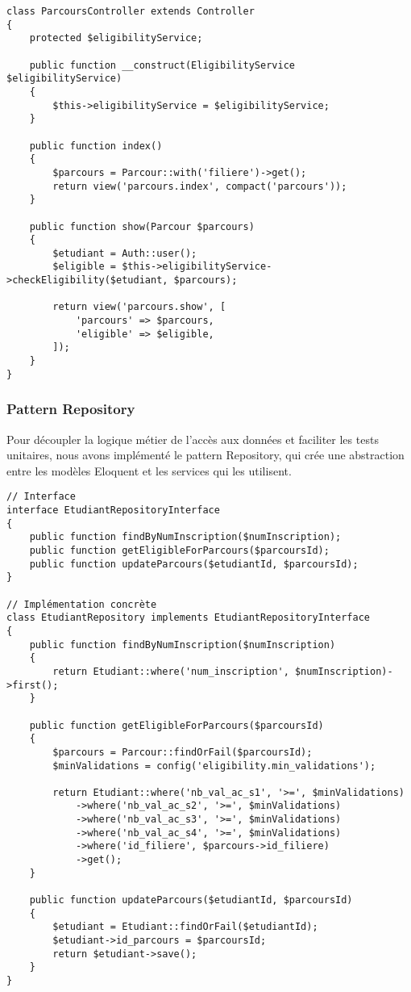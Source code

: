 \documentclass[french,12pt]{report} %
\begin{document}
\begin{lstlisting}[style=phpstyle, caption={Exemple de contrôleur MVC - ParcoursController.php}]
class ParcoursController extends Controller
{
    protected $eligibilityService;
    
    public function __construct(EligibilityService $eligibilityService)
    {
        $this->eligibilityService = $eligibilityService;
    }
    
    public function index()
    {
        $parcours = Parcour::with('filiere')->get();
        return view('parcours.index', compact('parcours'));
    }
    
    public function show(Parcour $parcours)
    {
        $etudiant = Auth::user();
        $eligible = $this->eligibilityService->checkEligibility($etudiant, $parcours);
        
        return view('parcours.show', [
            'parcours' => $parcours,
            'eligible' => $eligible,
        ]);
    }
}
\end{lstlisting}

\subsubsection{Pattern Repository}

Pour découpler la logique métier de l'accès aux données et faciliter les tests unitaires, nous avons implémenté le pattern Repository, qui crée une abstraction entre les modèles Eloquent et les services qui les utilisent.

\begin{lstlisting}[style=phpstyle, caption={Interface et implémentation de Repository}]
// Interface
interface EtudiantRepositoryInterface
{
    public function findByNumInscription($numInscription);
    public function getEligibleForParcours($parcoursId);
    public function updateParcours($etudiantId, $parcoursId);
}

// Implémentation concrète
class EtudiantRepository implements EtudiantRepositoryInterface
{
    public function findByNumInscription($numInscription)
    {
        return Etudiant::where('num_inscription', $numInscription)->first();
    }
    
    public function getEligibleForParcours($parcoursId)
    {
        $parcours = Parcour::findOrFail($parcoursId);
        $minValidations = config('eligibility.min_validations');
        
        return Etudiant::where('nb_val_ac_s1', '>=', $minValidations)
            ->where('nb_val_ac_s2', '>=', $minValidations)
            ->where('nb_val_ac_s3', '>=', $minValidations)
            ->where('nb_val_ac_s4', '>=', $minValidations)
            ->where('id_filiere', $parcours->id_filiere)
            ->get();
    }
    
    public function updateParcours($etudiantId, $parcoursId)
    {
        $etudiant = Etudiant::findOrFail($etudiantId);
        $etudiant->id_parcours = $parcoursId;
        return $etudiant->save();
    }
}
\end{lstlisting}
\end{document}
